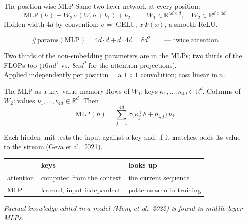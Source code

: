 \documentclass[11pt,aspectratio=169]{beamer}
\newcommand{\R}{\mathbb{R}}
\newcommand{\MLP}{\mathrm{MLP}}
\newcommand{\T}{^{\top}}
\newcommand{\hook}[1]{{\small\textcolor{gray!60!black}{\textit{#1}}}}
\begin{document}
\begin{frame}{The position-wise MLP}
  Same two-layer network at every position:
  \[
    \MLP(h) = W_2\,\sigma(W_1h + b_1) + b_2,\qquad W_1\in\R^{4d\times d},\quad W_2\in\R^{d\times 4d}.
  \]
  Hidden width $4d$ by convention; $\sigma = $ GELU, $x\,\Phi(x)$, a smooth ReLU.

  \vspace{0.8em}
  \[
    \#\text{params}(\MLP) = 4d\cdot d + d\cdot 4d = 8d^2 \qquad\text{--- twice attention.}
  \]

  \vspace{0.6em}
  Two thirds of the non-embedding parameters are in the MLPs; two thirds of the FLOPs too
  ($16nd^2$ vs.\ $8nd^2$ for the attention projections).\\
  Applied independently per position = a $1\times 1$ convolution; cost linear in $n$.
\end{frame}

\begin{frame}{The MLP as a key--value memory}
  Rows of $W_1$: keys $\kappa_1,\dots,\kappa_{4d}\in\R^d$. Columns of $W_2$: values
  $\nu_1,\dots,\nu_{4d}\in\R^d$. Then
  \[
    \MLP(h) = \sum_{j=1}^{4d}\sigma\big(\kappa_j\T h + b_{1,j}\big)\,\nu_j .
  \]

  \vspace{0.6em}
  Each hidden unit tests the input against a key and, if it matches, adds its value to the
  stream (Geva et al.\ 2021).

  \vspace{0.8em}
  \begin{center}
  \begin{tabular}{@{}lll@{}}
    \toprule
    & keys & looks up \\
    \midrule
    attention & computed from the context & the current sequence \\
    MLP & learned, input-independent & patterns seen in training \\
    \bottomrule
  \end{tabular}
  \end{center}

  \vspace{0.4em}
  \hook{Factual knowledge edited in a model (Meng et al.\ 2022) is found in middle-layer
  MLPs.}
\end{frame}
\end{document}
